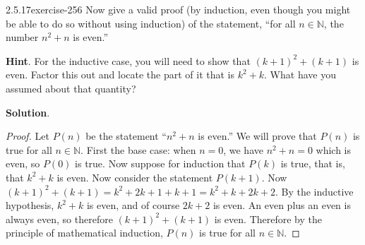 \documentclass[twoside,11pt,]{book}
\numberwithin{equation}{chapter}
\newcommand{\N}{\mathbb N}
\begin{document}
\begin{divisionsolution}{2.5.17}{}{exercise-256}%
\hypertarget{p-3651}{}%
Now give a valid proof (by induction, even though you might be able to do so without using induction) of the statement, ``for all \(n \in \N\), the number \(n^2 + n\) is even.''%
\par\smallskip%
\noindent\textbf{Hint}.\quad%
\hypertarget{p-3652}{}%
For the inductive case, you will need to show that \((k+1)^2 + (k+1)\) is even.  Factor this out and locate the part of it that is \(k^2 + k\).  What have you assumed about that quantity?%
\par\smallskip%
\noindent\textbf{Solution}.\quad%
\begin{proof}{}
\hypertarget{p-3653}{}%
Let \(P(n)\) be the statement ``\(n^2 + n\) is even.'' We will prove that \(P(n)\) is true for all \(n \in \N\). First the base case: when \(n = 0\), we have \(n^2 + n = 0\) which is even, so \(P(0)\) is true. Now suppose for induction that \(P(k)\) is true, that is, that \(k^2 + k\) is even. Now consider the statement \(P(k+1)\). Now \((k+1)^2 + (k+1) = k^2 + 2k + 1 + k + 1 = k^2 + k + 2k + 2\). By the inductive hypothesis, \(k^2 + k\) is even, and of course \(2k + 2\) is even. An even plus an even is always even, so therefore \((k+1)^2 + (k+1)\) is even. Therefore by the principle of mathematical induction, \(P(n)\) is true for all \(n \in \N\).%
\end{proof}
\end{divisionsolution}%
\end{document}
